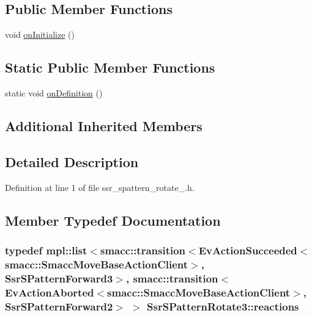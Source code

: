 \subsection*{Public Member Functions}
\begin{DoxyCompactItemize}
\item 
void \hyperlink{structSsrSPatternRotate3_a343a04a297e2b3801e4f7224fa6517a5}{on\+Initialize} ()
\end{DoxyCompactItemize}
\subsection*{Static Public Member Functions}
\begin{DoxyCompactItemize}
\item 
static void \hyperlink{structSsrSPatternRotate3_abd553dc366393f10fb622eb717b92f1b}{on\+Definition} ()
\end{DoxyCompactItemize}
\subsection*{Additional Inherited Members}


\subsection{Detailed Description}


Definition at line 1 of file ssr\+\_\+spattern\+\_\+rotate\+\_.\+h.



\subsection{Member Typedef Documentation}
\subsubsection[{\texorpdfstring{reactions}{reactions}}]{\setlength{\rightskip}{0pt plus 5cm}typedef mpl\+::list$<${\bf smacc\+::transition}$<$Ev\+Action\+Succeeded$<${\bf smacc\+::\+Smacc\+Move\+Base\+Action\+Client}$>$, {\bf Ssr\+S\+Pattern\+Forward3}$>$, {\bf smacc\+::transition}$<$Ev\+Action\+Aborted$<${\bf smacc\+::\+Smacc\+Move\+Base\+Action\+Client}$>$, {\bf Ssr\+S\+Pattern\+Forward2}$>$ $>$ {\bf Ssr\+S\+Pattern\+Rotate3\+::reactions}}\hypertarget{structSsrSPatternRotate3_ac0a1840dc4d2ddc813d76475ddf7a082}{}\label{structSsrSPatternRotate3_ac0a1840dc4d2ddc813d76475ddf7a082}


